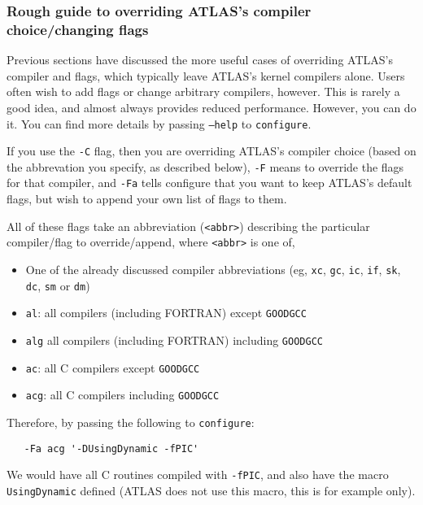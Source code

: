 \documentclass[11pt]{article}
\begin{document}
\subsubsection{Rough guide to overriding ATLAS's compiler choice/changing flags}
\label{sec-cc-override}
Previous sections have discussed the more useful cases of overriding
ATLAS's compiler and flags, which typically leave ATLAS's kernel compilers
alone.  Users often wish to add flags or change arbitrary compilers, however.
This is rarely a good idea, and almost always provides reduced performance.
However, you can do it.  You can find more details by passing 
{\tt --help} to {\tt configure}.  

If you use the {\tt -C} flag, then you are overriding ATLAS's compiler
choice (based on the abbrevation you specify, as described below),
{\tt -F} means to override the flags for that compiler, and {\tt -Fa}
tells configure that you want to keep ATLAS's default flags, but wish
to append your own list of flags to them.

All of these flags take an abbreviation (\verb+<abbr>+) describing the 
particular compiler/flag to override/append,
where \verb|<abbr>| is one of,
\begin{itemize}
\item One of the already discussed compiler abbreviations 
      (eg, {\tt xc}, {\tt gc}, {\tt ic}, {\tt if}, {\tt sk}, {\tt dc}, {\tt sm} 
       or {\tt dm})
\item {\tt al}: all compilers (including FORTRAN) except {\tt GOODGCC}
\item {\tt alg} all compilers (including FORTRAN) including {\tt GOODGCC}
\item {\tt  ac}: all C compilers except {\tt GOODGCC}
\item {\tt acg}: all C compilers including {\tt GOODGCC}
\end{itemize}

Therefore, by passing the following to {\tt configure}:
\vspace*{-0.1in}
\begin{verbatim}
   -Fa acg '-DUsingDynamic -fPIC'
\end{verbatim}

We would have all C routines compiled with {\tt -fPIC}, and also have the
macro {\tt UsingDynamic} defined (ATLAS does not use this macro, this is
for example only).

\end{document}
